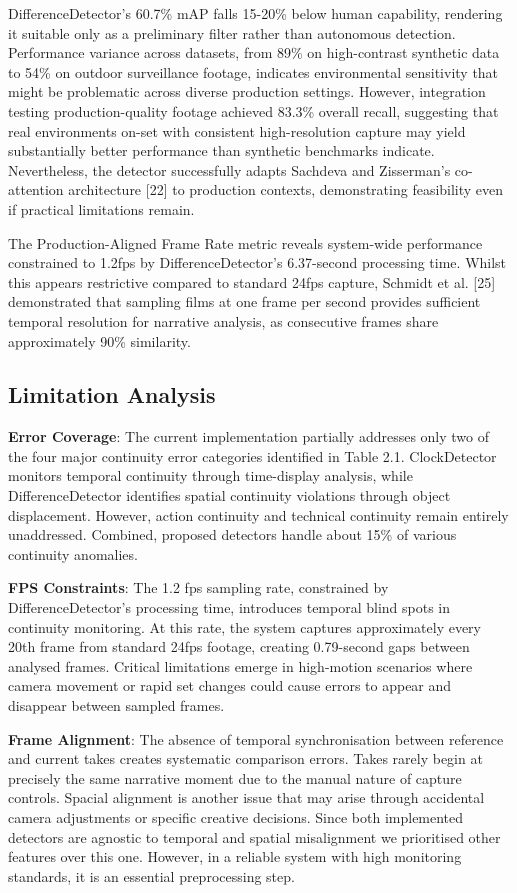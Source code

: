 DifferenceDetector's 60.7\% mAP falls 15-20\% below human capability, rendering it suitable only as a preliminary filter rather than autonomous detection. Performance variance across datasets, from 89\% on high-contrast synthetic data to 54\% on outdoor surveillance footage, indicates environmental sensitivity that might be problematic across diverse production settings. However, integration testing production-quality footage achieved 83.3\% overall recall, suggesting that real environments on-set with consistent high-resolution capture may yield substantially better performance than synthetic benchmarks indicate. Nevertheless, the detector successfully adapts Sachdeva and Zisserman's co-attention architecture [22] to production contexts, demonstrating feasibility even if practical limitations remain.

The Production-Aligned Frame Rate metric reveals system-wide performance constrained to 1.2fps by DifferenceDetector's 6.37-second processing time. Whilst this appears restrictive compared to standard 24fps capture, Schmidt et al. [25] demonstrated that sampling films at one frame per second provides sufficient temporal resolution for narrative analysis, as consecutive frames share approximately 90\% similarity.

\subsection{Limitation Analysis}
\textbf{Error Coverage}: The current implementation partially addresses only two of the four major continuity error categories identified in Table 2.1. ClockDetector monitors temporal continuity through time-display analysis, while DifferenceDetector identifies spatial continuity violations through object displacement. However, action continuity and technical continuity remain entirely unaddressed. Combined, proposed detectors handle about 15\% of various continuity anomalies.

\textbf{FPS Constraints}: The 1.2 fps sampling rate, constrained by DifferenceDetector's processing time, introduces temporal blind spots in continuity monitoring. At this rate, the system captures approximately every 20th frame from standard 24fps footage, creating 0.79-second gaps between analysed frames. Critical limitations emerge in high-motion scenarios where camera movement or rapid set changes could cause errors to appear and disappear between sampled frames.

\textbf{Frame Alignment}: The absence of temporal synchronisation between reference and current takes creates systematic comparison errors. Takes rarely begin at precisely the same narrative moment due to the manual nature of capture controls. Spacial alignment is another issue that may arise through accidental camera adjustments or specific creative decisions. Since both implemented detectors are agnostic to temporal and spatial misalignment we prioritised other features over this one. However, in a reliable system with high monitoring standards, it is an essential preprocessing step.

